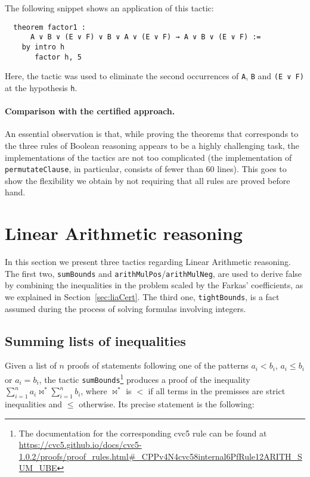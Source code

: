 The following snippet shows an application of this tactic:

\begin{verbatim}
  theorem factor1 :
      A ∨ B ∨ (E ∨ F) ∨ B ∨ A ∨ (E ∨ F) → A ∨ B ∨ (E ∨ F) :=
    by intro h
       factor h, 5
\end{verbatim}

Here, the tactic was used to eliminate the second occurrences of \texttt{A}, \texttt{B} and
\texttt{(E ∨ F)} at the hypothesis \texttt{h}.


\paragraph{Comparison with the certified approach.} An essential observation is that, while proving the theorems that corresponds to the three rules of Boolean reasoning appears to be a highly
challenging task, the implementations of the tactics are not too complicated (the implementation of \texttt{permutateClause},
in particular, consists of fewer than 60 lines). This goes to show the flexibility we obtain by not requiring
that all rules are proved before hand.

\section{Linear Arithmetic reasoning}

In this section we present three tactics regarding Linear Arithmetic reasoning.
The first two, \texttt{sumBounds} and \texttt{arithMulPos}/\texttt{arithMulNeg},
are used to derive false by combining the inequalities in the problem scaled by
the Farkas' coefficients, as we explained in Section~\ref{sec:liaCert}.
The third one, \texttt{tightBounds}, is a fact assumed during the process of
solving formulas involving integers.

\subsection{Summing lists of inequalities}

Given a list of $n$ proofs of statements following one of the patterns $a_{i} < b_{i}$, $a_{i} \le b_{i}$ or $a_{i} = b_{i}$,
the tactic \texttt{sumBounds}\footnote{The documentation for the corresponding cvc5 rule can be found at \url{https://cvc5.github.io/docs/cvc5-1.0.2/proofs/proof\_rules.html\#\_CPPv4N4cvc58internal6PfRule12ARITH\_SUM\_UBE}}
produces a proof of the inequality $\sum_{i = 1}^{n} a_{i} \bowtie^{*} \sum_{i = 1}^{n} b_{i}$, where $\bowtie^{*}$ is $<$ if
all terms in the premisses are strict inequalities and $\le$ otherwise. Its precise statement is the following:

